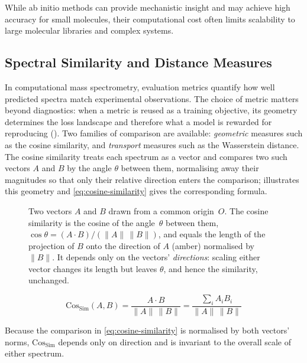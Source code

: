 While ab initio methods can provide mechanistic insight and may achieve high accuracy for small molecules, their computational cost often limits scalability to large molecular libraries and complex systems. \cite[p.~702]{Wei2019}


\subsection{Spectral Similarity and Distance Measures}
\label{sec:spectral-measures}

In computational mass spectrometry, evaluation metrics quantify how well predicted spectra match experimental observations.
The choice of metric matters beyond diagnostics: when a metric is reused as a training objective, its geometry determines the loss landscape and therefore what a model is rewarded for reproducing ().
Two families of comparison are available: \emph{geometric} measures such as the cosine similarity, and \emph{transport} measures such as the Wasserstein distance.
The cosine similarity treats each spectrum as a vector and compares two such vectors $A$ and $B$ by the angle $\theta$ between them, normalising away their magnitudes so that only their relative direction enters the comparison;  illustrates this geometry and \cref{eq:cosine-similarity} gives the corresponding formula. \cite[p.~4]{Wang2022}

\begin{figure}[H]
    \centering
    \resizebox{\textwidth}{!}{
        
    }
    \caption[Cosine similarity geometry]{
        Two vectors $A$ and $B$ drawn from a common
        origin~$O$. The cosine similarity is the cosine of the angle~$\theta$ between
        them, $\cos\theta = (A\cdot B)/(\|A\|\,\|B\|)$, and equals the length of the
        projection of $B$ onto the direction of $A$ (amber) normalised by $\|B\|$. It
        depends only on the vectors' \emph{directions}: scaling either vector changes its
        length but leaves $\theta$, and hence the similarity, unchanged.
    }
    \label{fig:cosine-distance-illustration}
\end{figure}
\begin{equation}
    \label{eq:cosine-similarity}
    \mathrm{Cos_{Sim}}(A,B) = \frac{A\cdot B}{\|A\|\,\|B\|} = \frac{\sum_i A_i B_i}{\|A\|\,\|B\|}
\end{equation}

Because the comparison in \cref{eq:cosine-similarity} is normalised by both vectors' norms, $\mathrm{Cos_{Sim}}$ depends only on direction and is invariant to the overall scale of either spectrum.

